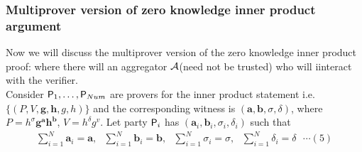 \subsubsection{Multiprover version of zero knowledge inner product argument}
Now we will discuss the multiprover version of the zero knowledge inner product proof: where there will an aggregator $\mathcal{A}$(need not be trusted) who will iinteract with the verifier.\\
Consider $\mathsf{P}_1,\ldots, \mathsf{P}_{Num}$ are provers for the inner product statement i.e. $\{(P,V,\bm{g},\bm{h},g,h)\}$ and the corresponding witness is $(\bm{a},\bm{b}, \sigma, \delta)$, where $P= h^{\sigma} \bm{g}^{\bm{a}} \bm{h}^{\bm{b}}$, $V=h^{\delta}g^{v}$. Let party $\mathsf{P}_i$ has $(\bm{a}_i,\bm{b}_i,\sigma_i,\delta_i)$ such that
\begin{align*}
	\sum\limits_{i=1}^{N}\bm{a}_i=\bm{a},\text{ }
	\sum\limits_{i=1}^{N}\bm{b}_i=\bm{b},\text{ }
	\sum\limits_{i=1}^{N}\sigma_i=\sigma,\text{ }
	\sum\limits_{i=1}^{N}\delta_i=\delta \text{ }\cdots(5)
\end{align*}

